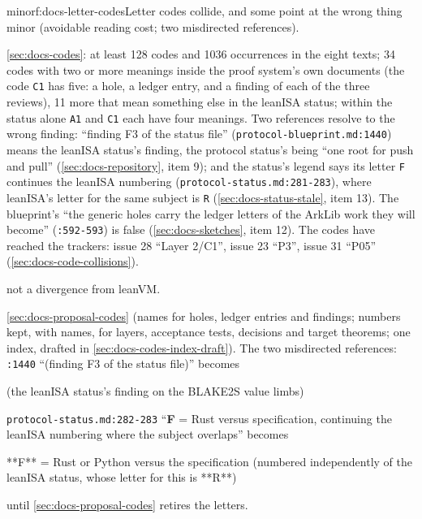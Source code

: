 \begin{finding}{minor}{f:docs-letter-codes}{Letter codes collide, and some point at the wrong thing}
 minor (avoidable reading cost; two misdirected references).
 \begin{sloppypar}
\cref{sec:docs-codes}: at least 128 codes and 1036 occurrences in the eight texts; 34 codes with two or more meanings inside the proof system's own documents (the code \texttt{C1} has five: a hole, a ledger entry, and a finding of each of the three reviews), 11 more that mean something else in the leanISA status; within the status alone \texttt{A1} and \texttt{C1} each have four meanings. Two references resolve to the wrong finding: ``finding F3 of the status file'' (\texttt{protocol-\allowbreak{}blueprint.\allowbreak{}md:\allowbreak{}1440}) means the leanISA status's finding, the protocol status's being ``one root for push and pull'' (\cref{sec:docs-repository}, item 9); and the status's legend says its letter \texttt{F} continues the leanISA numbering (\texttt{protocol-\allowbreak{}status.\allowbreak{}md:\allowbreak{}281-\allowbreak{}283}), where leanISA's letter for the same subject is \texttt{R} (\cref{sec:docs-status-stale}, item 13). The blueprint's ``the generic holes carry the ledger letters of the ArkLib work they will become'' (\texttt{:\allowbreak{}592-\allowbreak{}593}) is false (\cref{sec:docs-sketches}, item 12). The codes have reached the trackers: issue 28 ``Layer 2/C1'', issue 23 ``P3'', issue 31 ``P05'' (\cref{sec:docs-code-collisions}).
\end{sloppypar}
 not a divergence from leanVM.
 \begin{sloppypar}
\cref{sec:docs-proposal-codes} (names for holes, ledger entries and findings; numbers kept, with names, for layers, acceptance tests, decisions and target theorems; one index, drafted in \cref{sec:docs-codes-index-draft}). The two misdirected references: \texttt{:\allowbreak{}1440} ``(finding F3 of the status file)'' becomes
\end{sloppypar}

\begin{srccode}
(the leanISA status's finding on the BLAKE2S value limbs)
\end{srccode}

\texttt{protocol-\allowbreak{}status.\allowbreak{}md:\allowbreak{}282-\allowbreak{}283} ``\textbf{F} = Rust versus specification, continuing the leanISA numbering where the subject overlaps'' becomes

\begin{srccode}
**F** = Rust or Python versus the specification (numbered independently of the leanISA status, whose letter for this is **R**)
\end{srccode}

until \cref{sec:docs-proposal-codes} retires the letters.
\end{finding}

